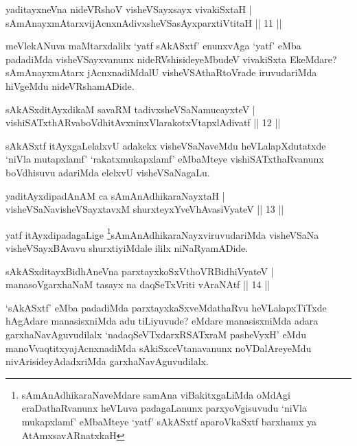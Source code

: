 
\begin{shl}
yaditayxneVna nideVRshoV visheVSayxsayx vivakiSxtaH |\\
sAmAnayxmAtarxvijAcnxnAdivxsheVSasAyxparxtiVtitaH \hfill || 11 ||
\end{shl}

\begin{artha}
meVlekANuva maMtarxdalilx `yatf sAkASxtf' enunxvAga `yatf' eMba padadiMda visheVSayxvanunx nideRVshisideyeMbudeV vivakiSxta EkeMdare? sAmAnayxmAtarx jAcnxnadiMdalU visheVSAthaRtoVrade iruvudariMda hiVgeMdu nideVRshamADide.
\end{artha}

\begin{shl}
sAkASxditAyxdikaM savaRM tadivxsheVSaNamucayxteV |\\
vishiSATxthARvaboVdhitAvxninxVlarakotxVtapxlAdivatf \hfill || 12 ||
\end{shl}

\begin{artha}
sAkASxtf itAyxgaLelalxvU adakekx visheVSaNaveMdu heVLalapXdutatxde `niVla mutapxlamf' `rakatxmukapxlamf' eMbaMteye vishiSATxthaRvanunx boVdhisuvu adariMda elelxvU visheVSaNagaLu.
\end{artha}

\begin{shl}
yaditAyxdipadAnAM ca sAmAnAdhikaraNayxtaH |\\
visheVSaNavisheVSayxtavxM shurxteyxYveVhAvasiVyateV \hfill || 13 ||
\end{shl}

\begin{artha}
yatf itAyxdipadagaLige \footnote{sAmAnAdhikaraNaveMdare samAna viBakitxgaLiMda oMdAgi eraDathaRvanunx heVLuva padagaLanunx parxyoVgisuvudu `niVla mukapxlamf' eMbaMteye `yatf' sAkASxtf aparoVkaSxtf barxhamx ya AtAmxsavARnatxkaH}sAmAnAdhikaraNayxviruvudariMda visheVSaNa visheVSayxBAvavu shurxtiyiMdale ililx niNaRyamADide.
\end{artha}


\begin{shl}
sAkASxditayxBidhAneVna parxtayxkoSxV\s thoVR\s BidhiVyateV |\\
manasoV\s garxhaNaM tasayx na daqSeTxVriti vAraNAtf \hfill || 14 ||
\end{shl}

\begin{artha}
`sAkASxtf' eMba padadiMda parxtayxkaSxveMdathaRvu heVLalapxTiTxde hAgAdare manasisxniMda adu tiLiyuvude? eMdare manasisxniMda adara garxhaNavAguvudilalx `nadaqSeVTxdarxRSATxraM pasheVyxH' eMdu manoVvaqtitxyajAcnxnadiMda sAkiSxceVtanavanunx noVDalAreyeMdu nivArisideyAdadxriMda garxhaNavAguvudilalx.
\end{artha}

